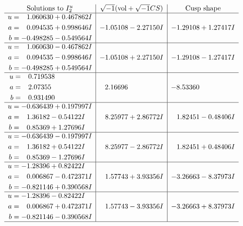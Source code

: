 \documentclass[1p]{elsarticle_modified}
\theoremstyle{definition}
\newcommand{\I}{\sqrt{-1}}
\begin{document}
$$\begin{array}{c|c|c}  
\text{Solutions to }I^u_{2}& \I (\text{vol} + \sqrt{-1}CS) & \text{Cusp shape}\\
 \hline 
\begin{aligned}
u &= \phantom{-}1.060630 + 0.467862 I \\
a &= \phantom{-}0.094535 + 0.998646 I \\
b &= -0.498285 - 0.549564 I\end{aligned}
 & -1.05108 - 2.27150 I & -1.29108 + 1.27417 I \\ \hline\begin{aligned}
u &= \phantom{-}1.060630 - 0.467862 I \\
a &= \phantom{-}0.094535 - 0.998646 I \\
b &= -0.498285 + 0.549564 I\end{aligned}
 & -1.05108 + 2.27150 I & -1.29108 - 1.27417 I \\ \hline\begin{aligned}
u &= \phantom{-}0.719538\phantom{ +0.000000I} \\
a &= \phantom{-}2.07355\phantom{ +0.000000I} \\
b &= \phantom{-}0.931490\phantom{ +0.000000I}\end{aligned}
 & \phantom{-}2.16696\phantom{ +0.000000I} & -8.53360\phantom{ +0.000000I} \\ \hline\begin{aligned}
u &= -0.636439 + 0.197997 I \\
a &= \phantom{-}1.36182 - 0.54122 I \\
b &= \phantom{-}0.85369 + 1.27696 I\end{aligned}
 & \phantom{-}8.25977 + 2.86772 I & \phantom{-}1.82451 - 0.48406 I \\ \hline\begin{aligned}
u &= -0.636439 - 0.197997 I \\
a &= \phantom{-}1.36182 + 0.54122 I \\
b &= \phantom{-}0.85369 - 1.27696 I\end{aligned}
 & \phantom{-}8.25977 - 2.86772 I & \phantom{-}1.82451 + 0.48406 I \\ \hline\begin{aligned}
u &= -1.28396 + 0.82422 I \\
a &= \phantom{-}0.006867 - 0.472371 I \\
b &= -0.821146 + 0.390568 I\end{aligned}
 & \phantom{-}1.57743 + 3.93356 I & -3.26663 - 8.37973 I \\ \hline\begin{aligned}
u &= -1.28396 - 0.82422 I \\
a &= \phantom{-}0.006867 + 0.472371 I \\
b &= -0.821146 - 0.390568 I\end{aligned}
 & \phantom{-}1.57743 - 3.93356 I & -3.26663 + 8.37973 I\\
 \hline 
 \end{array}$$\newpage
\end{document}
